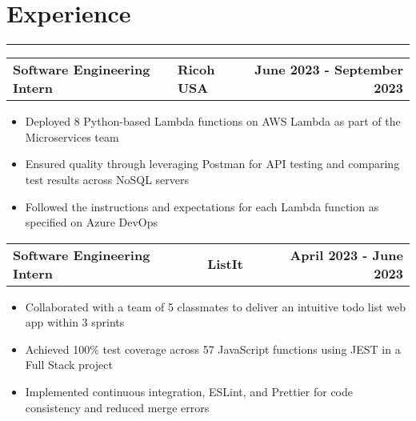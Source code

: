 \documentclass[a4paper,10pt]{article}
\begin{document}
\section*{Experience}
\vspace{-18pt}
\noindent\rule{\textwidth}{0.4pt}
\vspace{5pt}
\begin{tabularx}{\textwidth}{ l X r }
\textbf{Software Engineering Intern} & \centering \textbf{Ricoh USA} & \textbf{June 2023 - September 2023} \\
\end{tabularx}
\begin{itemize}[leftmargin=*,label=\textbullet]
  \item Deployed 8 Python-based Lambda functions on AWS Lambda as part of the Microservices team
  \item Ensured quality through leveraging Postman for API testing and comparing test results across NoSQL servers
  \item Followed the instructions and expectations for each Lambda function as specified on Azure DevOps
\end{itemize}
\vspace{10pt}
\begin{tabularx}{\textwidth}{ l X r }
\textbf{Software Engineering Intern} & \centering \textbf{ListIt} & \textbf{April 2023 - June 2023} \\
\end{tabularx}
\begin{itemize}[leftmargin=*,label=\textbullet]
  \item Collaborated with a team of 5 classmates to deliver an intuitive todo list web app within 3 sprints
  \item Achieved 100\% test coverage across 57 JavaScript functions using JEST in a Full Stack project
  \item Implemented continuous integration, ESLint, and Prettier for code consistency and reduced merge errors
\end{itemize}
\vspace{10pt}
\end{document}
